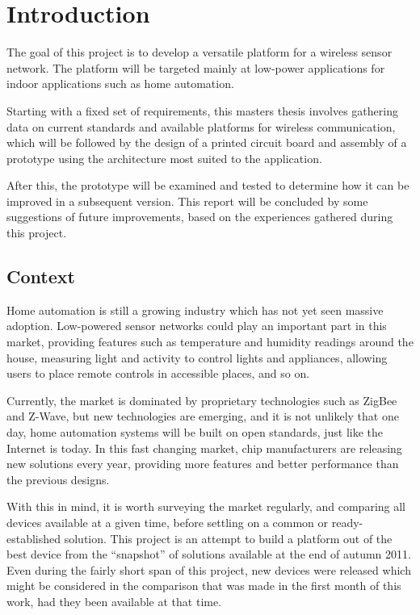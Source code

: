 \chapter{Introduction}\label{ch:introduction}

The goal of this project is to develop a versatile platform for a wireless
sensor network. The platform will be targeted mainly at low-power applications
for indoor applications such as home automation. 

Starting with a fixed set of requirements, this masters thesis involves
gathering data on current standards and available platforms for wireless
communication, which will be followed by the design of a printed circuit board
and assembly of a prototype using the architecture most suited to the
application.

After this, the prototype will be examined and tested to determine how it can be
improved in a subsequent version. This report will be concluded by some
suggestions of future improvements, based on the experiences gathered during
this project.

\section{Context}\label{sec:context}

Home automation is still a growing industry which has not yet seen massive
adoption. Low-powered sensor networks could play an important part in this
market, providing features such as temperature and humidity readings around the
house, measuring light and activity to control lights and appliances, allowing
users to place remote controls in accessible places, and so on.

Currently, the market is dominated by proprietary technologies such as ZigBee
and Z-Wave, but new technologies are emerging, and it is not unlikely that one
day, home automation systems will be built on open standards, just like the
Internet is today. In this fast changing market, chip manufacturers are
releasing new solutions every year, providing more features and better
performance than the previous designs. 

With this in mind, it is worth surveying the market regularly, and comparing all
devices available at a given time, before settling on a common or
ready-established solution. This project is an attempt to build a platform out
of the best device from the ``snapshot'' of solutions available at the end of
autumn 2011. Even during the fairly short span of this project, new devices were
released which might be considered in the comparison that was made in the first
month of this work, had they been available at that time.

